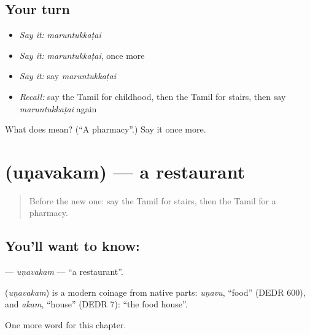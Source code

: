 \subsection*{Your turn}
\begin{itemize}
\raggedright
  \item \emph{Say it:} \emph{maruntukkaṭai}
  \item \emph{Say it:} \emph{maruntukkaṭai}, once more
  \item \emph{Say it:} say \emph{maruntukkaṭai}
  \item \emph{Recall:} say the Tamil for childhood, then the Tamil for stairs, then say \emph{maruntukkaṭai} again
\end{itemize}

\begin{tcolorbox}[breakable,colback=teal!4,colframe=teal!35!black,title={Before you move on}]
What does  mean? (\textquotedblleft{}A pharmacy\textquotedblright{}.) Say it once more.
\end{tcolorbox}
\section[\texorpdfstring{\ta{உணவகம்} (uṇavakam)}{உணவகம் (uṇavakam)}]{ (uṇavakam) — a restaurant}

\label{lesson:TA-C204-unavakam}



\begin{quote}
Before the new one: say the Tamil for stairs, then the Tamil for a pharmacy.
\end{quote}

\subsection*{You'll want to know: }
\textbf{} — \emph{uṇavakam} — \textquotedblleft{}a restaurant\textquotedblright{}.

\begin{cousinweb}
\textbf{} (\emph{uṇavakam}) is a modern coinage from native parts: \emph{uṇavu}, \textquotedblleft{}food\textquotedblright{} (DEDR 600), and \emph{akam}, \textquotedblleft{}house\textquotedblright{} (DEDR 7): \textquotedblleft{}the food house\textquotedblright{}.
\end{cousinweb}

\begin{grammarlens}[title={What you've built}]
One more word for this chapter.
\end{grammarlens}

